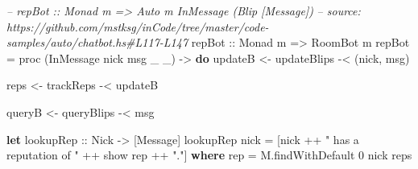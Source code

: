 \documentclass[]{article}
\newenvironment{Shaded}{}{}
\newcommand{\KeywordTok}[1]{\textcolor[rgb]{0.00,0.44,0.13}{\textbf{#1}}}
\newcommand{\DataTypeTok}[1]{\textcolor[rgb]{0.56,0.13,0.00}{#1}}
\newcommand{\DecValTok}[1]{\textcolor[rgb]{0.25,0.63,0.44}{#1}}
\newcommand{\StringTok}[1]{\textcolor[rgb]{0.25,0.44,0.63}{#1}}
\newcommand{\CommentTok}[1]{\textcolor[rgb]{0.38,0.63,0.69}{\textit{#1}}}
\newcommand{\OtherTok}[1]{\textcolor[rgb]{0.00,0.44,0.13}{#1}}
\newcommand{\FunctionTok}[1]{\textcolor[rgb]{0.02,0.16,0.49}{#1}}
\newcommand{\NormalTok}[1]{#1}
\begin{document}
\begin{Shaded}
\begin{Highlighting}[]
\CommentTok{-- repBot :: Monad m => Auto m InMessage (Blip [Message])}
\CommentTok{-- source: https://github.com/mstksg/inCode/tree/master/code-samples/auto/chatbot.hs#L117-L147}
\OtherTok{repBot ::} \DataTypeTok{Monad}\NormalTok{ m }\OtherTok{=>} \DataTypeTok{RoomBot}\NormalTok{ m}
\NormalTok{repBot }\FunctionTok{=}\NormalTok{ proc (}\DataTypeTok{InMessage}\NormalTok{ nick msg _ _) }\OtherTok{->} \KeywordTok{do}
\NormalTok{    updateB }\OtherTok{<-}\NormalTok{ updateBlips }\FunctionTok{-<}\NormalTok{ (nick, msg)}

\NormalTok{    reps    }\OtherTok{<-}\NormalTok{ trackReps   }\FunctionTok{-<}\NormalTok{ updateB}

\NormalTok{    queryB  }\OtherTok{<-}\NormalTok{ queryBlips  }\FunctionTok{-<}\NormalTok{ msg}

    \KeywordTok{let}\OtherTok{ lookupRep ::} \DataTypeTok{Nick} \OtherTok{->}\NormalTok{ [}\DataTypeTok{Message}\NormalTok{]}
\NormalTok{        lookupRep nick }\FunctionTok{=}\NormalTok{ [nick }\FunctionTok{++} \StringTok{" has a reputation of "} \FunctionTok{++}\NormalTok{ show rep }\FunctionTok{++} \StringTok{"."}\NormalTok{]}
          \KeywordTok{where}
\NormalTok{            rep }\FunctionTok{=}\NormalTok{ M.findWithDefault }\DecValTok{0}\NormalTok{ nick reps}


\end{Highlighting}
\end{Shaded}
\end{document}
